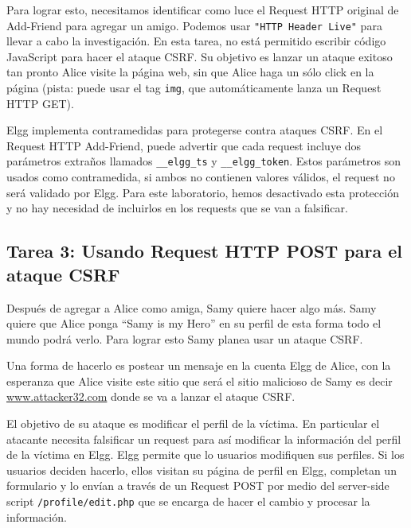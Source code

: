 Para lograr esto, necesitamos identificar como luce el Request HTTP original de Add-Friend para agregar un amigo. Podemos usar \texttt{"HTTP Header Live"} para llevar a cabo la investigación.
En esta tarea, no está permitido escribir código JavaScript para hacer el ataque CSRF. Su objetivo es lanzar un ataque exitoso tan pronto Alice visite la página web, sin que Alice haga un sólo click en la página (pista: puede usar el tag {\tt img}, que automáticamente lanza un Request HTTP GET).

Elgg implementa contramedidas para protegerse contra ataques CSRF. En el Request HTTP Add-Friend, puede advertir que cada request incluye dos parámetros extraños llamados \texttt{\_\_elgg\_ts} y  \texttt{\_\_elgg\_token}. Estos parámetros son usados como contramedida, si ambos no contienen valores válidos, el request no será validado por Elgg.
Para este laboratorio, hemos desactivado esta protección y no hay necesidad de incluirlos en los requests que se van a falsificar.


\subsection{Tarea 3: Usando Request HTTP POST para el ataque CSRF}

Después de agregar a Alice como amiga, Samy quiere hacer algo más. Samy quiere que Alice ponga ``Samy is my Hero'' en su perfil de esta forma todo el mundo podrá verlo. Para lograr esto Samy planea usar un ataque CSRF.

Una forma de hacerlo es postear un mensaje en la cuenta Elgg de Alice, con la esperanza que Alice visite este sitio que será el sitio malicioso de Samy es decir \url{www.attacker32.com} donde se va a lanzar el ataque CSRF.

El objetivo de su ataque es modificar el perfil de la víctima. En particular el atacante necesita falsificar un request para así modificar la información del perfil de la víctima en Elgg. Elgg permite que lo usuarios modifiquen sus perfiles. Si los usuarios deciden hacerlo, ellos visitan su página de perfil en Elgg, completan un formulario y lo envían a través de un Request POST por medio del server-side script {\tt /profile/edit.php} que se encarga de hacer el cambio y procesar la información.

